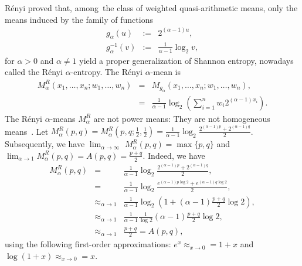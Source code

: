 \documentclass[entropy,article,accept,oneauthor,pdftex,entropy]{Definitions/mdpi}
\begin{document}
R\'enyi proved that, among~the class of weighted quasi-arithmetic means, only the means induced by the family of functions
\begin{eqnarray}
g_\alpha(u)&:=&2^{(\alpha-1)u},\\
g_\alpha^{-1}(v)&:=& \frac{1}{\alpha-1}\log_2 v,
\end{eqnarray}
for $\alpha>0$ and $\alpha\not=1$ yield a proper generalization of Shannon entropy, nowadays called the R\'enyi $\alpha$-entropy.
The R\'enyi $\alpha$-mean is
\begin{eqnarray}
M_\alpha^R(x_1,\ldots,x_n;w_1,\ldots,w_n) &=& M_{g_\alpha}\left(x_1,\ldots,x_n;w_1,\ldots,w_n\right),\\
&=&  \frac{1}{\alpha-1}\log_2 \left(\sum_{i=1}^n w_i 2^{(\alpha-1)x_i}\right).
\end{eqnarray}
The R\'enyi $\alpha$-means   $M_\alpha^R$ are not power means: They are not homogeneous means~\cite{Amari-2007}.
Let $M_\alpha^R(p,q)=M_\alpha^R\left(p,q;\frac{1}{2},\frac{1}{2}\right)=\frac{1}{\alpha-1}\log_2 \frac{2^{(\alpha-1)p}+2^{(\alpha-1)q}}{2}$. Subsequently, we have
$\lim_{\alpha\rightarrow\infty}$ $M_\alpha^R(p,q)=\max\{p,q\}$ and $\lim_{\alpha\rightarrow 1} M_\alpha^R(p,q)=A(p,q)=\frac{p+q}{2}$.
Indeed, we have
\begin{eqnarray*}
M_\alpha^R(p,q) &=& \frac{1}{\alpha-1}\log_2 \frac{2^{(\alpha-1)p}+2^{(\alpha-1)q}}{2},\\
&=&\frac{1}{\alpha-1}\log_2 \frac{e^{(\alpha-1)p\log 2}+e^{(\alpha-1)q\log 2}}{2},\\
&\approx_{\alpha\rightarrow 1}& \frac{1}{\alpha-1}\log_2 \left(1+(\alpha-1)\frac{p+q}{2}\log 2\right),\\
&\approx_{\alpha\rightarrow 1}& \frac{1}{\alpha-1} \frac{1}{\log 2}{(\alpha-1)\frac{p+q}{2}\log 2},\\
&\approx_{\alpha\rightarrow 1}&  \frac{p+q}{2}= A(p,q),
\end{eqnarray*}
using the following first-order approximations: $e^x\approx_{x\rightarrow 0}=1+x$ and $\log(1+x)\approx_{x\rightarrow 0}=x$.
\end{document}
